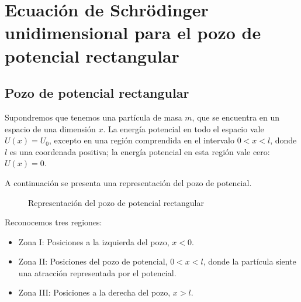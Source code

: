 
\chapter[Ecuación de Schrödinger para el pozo de potencial rectangular]
{Ecuación de Schrödinger unidimensional para el pozo de potencial rectangular}

\section{Pozo de potencial rectangular}
Supondremos que tenemos una partícula de masa $m$, que se encuentra en un
espacio de una dimensión $x$. La energía potencial en todo el espacio vale
$U(x)=U_0$, excepto en una región comprendida en el intervalo $0 < x < l$, donde
$l$ es una coordenada positiva; la energía potencial en esta región vale cero:
$U(x)=0$.

A continuación se presenta una representación del pozo de potencial.

\begin{figure}[ht]
\centering
{}
\caption{Representación del pozo de potencial rectangular}
\end{figure}

Reconocemos tres regiones:
\begin{itemize}
\item Zona I: Posiciones a la izquierda del pozo, $x<0$.
\item Zona II: Posiciones del pozo de potencial, $0<x<l$, donde la
partícula siente una atracción representada por el potencial.
\item Zona III: Posiciones a la derecha del pozo, $x>l$.
\end{itemize}

